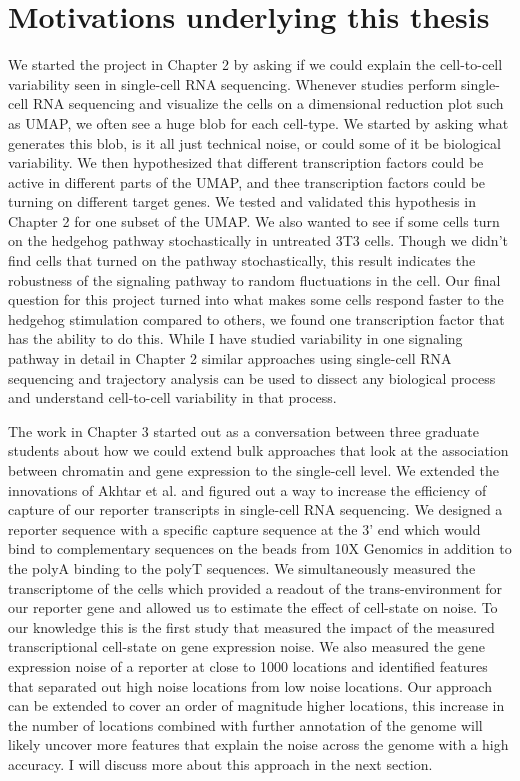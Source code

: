 \section{Motivations underlying this thesis}

We started the project in Chapter 2 by asking if we could explain the cell-to-cell variability seen in single-cell RNA sequencing. Whenever studies perform single-cell RNA sequencing and visualize the cells on a dimensional reduction plot such as UMAP, we often see a huge blob for each cell-type. We started by asking what generates this blob, is it all just technical noise, or could some of it be biological variability. We then hypothesized that different transcription factors could be active in different parts of the UMAP, and thee transcription factors could be turning on different target genes. We tested and validated this hypothesis in Chapter 2 for one subset of the UMAP. We also wanted to see if some cells turn on the hedgehog pathway stochastically in untreated 3T3 cells. Though we didn't find cells that turned on the pathway stochastically, this result indicates the robustness of the signaling pathway to random fluctuations in the cell. Our final question for this project turned into what makes some cells respond faster to the hedgehog stimulation compared to others, we found one transcription factor that has the ability to do this. While I have studied variability in one signaling pathway in detail in Chapter 2 similar approaches using single-cell RNA sequencing and trajectory analysis can be used to dissect any biological process and understand cell-to-cell variability in that process.

The work in Chapter 3 started out as a conversation between three graduate students about how we could extend bulk approaches that look at the association between chromatin and gene expression to the single-cell level. We extended the innovations of Akhtar et al. \cite{akhtarw_vansteenselb:ChromatinPosition2013} and figured out a way to increase the efficiency of capture of our reporter transcripts in single-cell RNA sequencing. We designed a reporter sequence with a specific capture sequence at the 3' end which would bind to complementary sequences on the beads from 10X Genomics in addition to the polyA binding to the polyT sequences. We simultaneously measured the transcriptome of the cells which provided a readout of the trans-environment for our reporter gene and allowed us to estimate the effect of cell-state on noise. To our knowledge this is the first study that measured the impact of the measured transcriptional cell-state on gene expression noise. We also measured the gene expression noise of a reporter at close to 1000 locations and identified features that separated out high noise locations from low noise locations. Our approach can be extended to cover an order of magnitude higher locations, this increase in the number of locations combined with further annotation of the genome will likely uncover more features that explain the noise across the genome with a high accuracy. I will discuss more about this approach in the next section.

